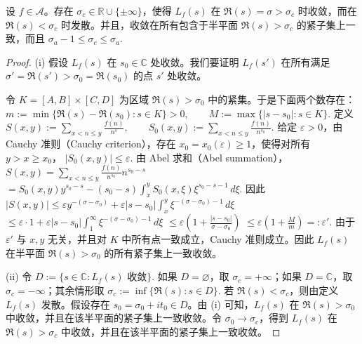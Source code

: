 \begin{theorem}[原文 Theorem 4.2]
	设 $f\in\mathcal A$。存在 $\sigma_c\in\mathbb R\cup\{\pm\infty\}$，使得 $L_f(s)$ 在 $\Re(s)=\sigma>\sigma_c$ 时收敛，而在 $\Re(s)<\sigma_c$ 时发散。并且，收敛在所有包含于半平面 $\Re(s)>\sigma_c$ 的紧子集上一致，而且
	\(\textstyle \sigma_a-1\leq\allowbreak{} \sigma_c\leq\allowbreak{} \sigma_a.\)
\end{theorem}

\begin{proof}
	(i) 假设 $L_f(s)$ 在 $s_0\in\mathbb C$ 处收敛。我们要证明 $L_f(s')$ 在所有满足 $\sigma'=\Re(s')>\sigma_0=\Re(s_0)$ 的点 $s'$ 处收敛。

	令
	\(\textstyle K=\allowbreak{}[A,\allowbreak{}B]\times[C,\allowbreak{}D]\)
	为区域 $\Re(s)>\sigma_0$ 中的紧集。于是下面两个数存在：
	\(\textstyle m:=\allowbreak{}\min\{\Re(s)-\Re(s_0):s\in K\}>0,\allowbreak{} \qquad M:=\allowbreak{}\max\{|s-s_0|:s\in K\}.\)
	定义
	\(\textstyle S(x,\allowbreak{}y):=\allowbreak{}\sum_{x<n\leq\allowbreak{} y}\frac{f(n)}{n^s},\allowbreak{} \qquad S_0(x,\allowbreak{}y):=\allowbreak{}\sum_{x<n\leq\allowbreak{} y}\frac{f(n)}{n^{s_0}}.\)
	给定 $\varepsilon>0$，由 Cauchy 准则（Cauchy criterion），存在 $x_0=x_0(\varepsilon)\geq 1$，使得对所有 $y>x\geq x_0$，
	\(\textstyle |S_0(x,\allowbreak{}y)|\leq\allowbreak{} \varepsilon.\)
	由 Abel 求和（Abel summation），
	\(\textstyle S(x,\allowbreak{}y) =\allowbreak{} \sum_{x<n\leq\allowbreak{} y}\frac{f(n)}{n^{s_0}}n^{s_0-s}\) \(\textstyle =\allowbreak{} S_0(x,\allowbreak{}y)y^{s_0-s} - (s_0-s)\int_x^y S_0(x,\allowbreak{}\xi)\xi^{s_0-s-1}\,d\xi.\)
	因此
	\(\textstyle |S(x,\allowbreak{}y)| \leq\allowbreak{} \varepsilon y^{-(\sigma-\sigma_0)} +\allowbreak{} \varepsilon |s-s_0|\int_x^y \xi^{-(\sigma-\sigma_0)-1}\,d\xi\) \(\textstyle \leq\allowbreak{} \varepsilon\cdot 1 +\allowbreak{} \varepsilon |s-s_0|\int_1^\infty \xi^{-(\sigma-\sigma_0)-1}\,d\xi\) \(\textstyle \leq\allowbreak{} \varepsilon\left(1+\allowbreak{}\frac{|s-s_0|}{\sigma-\sigma_0}\right)\) \(\textstyle \leq\allowbreak{} \varepsilon\left(1+\allowbreak{}\frac{M}{m}\right) =\allowbreak{}:\varepsilon'.\)
	由于 $\varepsilon'$ 与 $x,y$ 无关，并且对 $K$ 中所有点一致成立，Cauchy 准则成立。因此 $L_f(s)$ 在半平面 $\Re(s)>\sigma_0$ 的所有紧子集上一致收敛。

	(ii) 令
	\(\textstyle D:=\allowbreak{}\{s\in\mathbb C:L_f(s)\text{ 收敛}\}.\)
	如果 $D=\varnothing$，取 $\sigma_c=+\infty$；如果 $D=\mathbb C$，取 $\sigma_c=-\infty$；其余情形取
	\(\textstyle \sigma_c:=\allowbreak{}\inf\{\Re(s):s\in D\}.\)
	若 $\Re(s)<\sigma_c$，则由定义 $L_f(s)$ 发散。假设存在 $s_0=\sigma_0+it_0\in D$。由 (i) 可知，$L_f(s)$ 在 $\Re(s)>\sigma_0$ 中收敛，并且在该半平面的紧子集上一致收敛。令 $\sigma_0\to\sigma_c$，得到 $L_f(s)$ 在 $\Re(s)>\sigma_c$ 中收敛，并且在该半平面的紧子集上一致收敛。


\end{proof}
